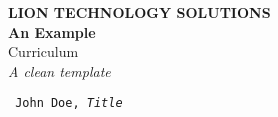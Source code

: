 \begingroup
\raggedleft %
\vspace*{\baselineskip} %
	
{\Large \textbf{LION TECHNOLOGY SOLUTIONS}}
\\[0.167\textheight]
{
	\LARGE\bfseries An Example
}
\\[\baselineskip] 	
{
	\Huge Curriculum
}
\\[\baselineskip]	
{%
	\Large
	\textit{A clean template}
}
\par	
\vfill %
	
{
\texttt{\large
	John Doe, \textit{Title}
}
}
\par	
\vspace*{6\baselineskip} %

\endgroup
